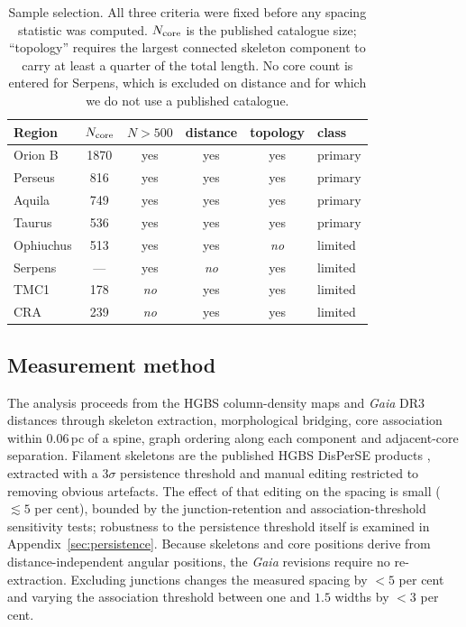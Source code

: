 \documentclass[usenatbib,twoside,twocolumn]{mnras}
\begin{document}
\begin{table}
\caption{Sample selection. All three criteria were fixed before any spacing statistic was computed. $N_{\rm core}$ is the published catalogue size; ``topology'' requires the largest connected skeleton component to carry at least a quarter of the total length. No core count is entered for Serpens, which is excluded on distance and for which we do not use a published catalogue.}
\label{tab:selection}
\footnotesize
\setlength{\tabcolsep}{4pt}
\begin{tabular}{lccccl}
\toprule
Region & $N_{\rm core}$ & $N>500$ & distance & topology & class \\
\midrule
Orion B   & 1870 & yes & yes & yes & primary \\
Perseus   & 816  & yes & yes & yes & primary \\
Aquila    & 749  & yes & yes & yes & primary \\
Taurus    & 536  & yes & yes & yes & primary \\
\midrule
Ophiuchus & 513  & yes & yes & \emph{no} & limited \\
Serpens   & ---  & yes & \emph{no} & yes & limited \\
TMC1      & 178  & \emph{no} & yes & yes & limited \\
CRA       & 239  & \emph{no} & yes & yes & limited \\
\bottomrule
\end{tabular}
\end{table}

\subsection{Measurement method}
\label{sec:methodology}

The analysis proceeds from the HGBS column-density maps and \textit{Gaia} DR3 distances through skeleton extraction, morphological bridging, core association within $0.06$\,pc of a spine, graph ordering along each component and adjacent-core separation. Filament skeletons are the published HGBS DisPerSE products \citep{Sousbie2011,Arzoumanian2011}, extracted with a $3\sigma$ persistence threshold and manual editing restricted to removing obvious artefacts. The effect of that editing on the spacing is small ($\lesssim5$ per cent), bounded by the junction-retention and association-threshold sensitivity tests; robustness to the persistence threshold itself is examined in Appendix~\ref{sec:persistence}. Because skeletons and core positions derive from distance-independent angular positions, the \textit{Gaia} revisions require no re-extraction. Excluding junctions changes the measured spacing by $<5$ per cent and varying the association threshold between one and $1.5$ widths by $<3$ per cent.
\end{document}
